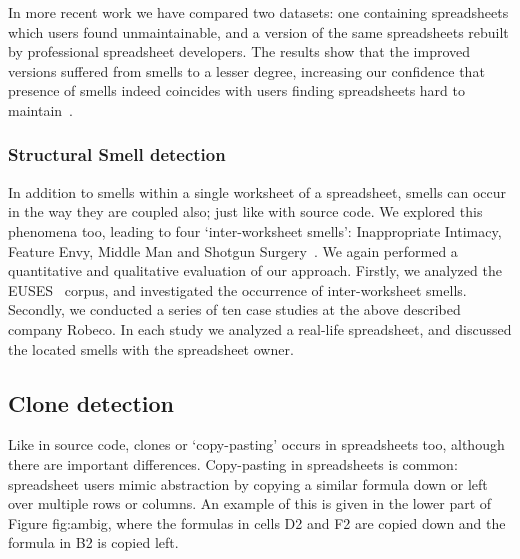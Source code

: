 \documentclass[conference]{IEEEtran}
\begin{document}
In more recent work we have compared two datasets: one containing spreadsheets which users found unmaintainable, and a version of the same spreadsheets rebuilt by professional spreadsheet developers. The results show that the improved versions suffered from smells to a lesser degree, increasing our confidence that presence of smells indeed coincides with users finding spreadsheets hard to maintain~\cite{Jansen2015}.



\subsubsection{Structural Smell detection}
In addition to smells within a single worksheet of a spreadsheet, smells can occur in the way they are coupled also; just like with source code. We explored this phenomena too, leading to four `inter-worksheet smells': Inappropriate Intimacy, Feature Envy, Middle Man and Shotgun Surgery~\cite{hermans_detecting_2012-1}. We again performed a quantitative and qualitative evaluation of our approach. Firstly, we analyzed the EUSES~\cite{fisher_euses_2005} corpus, and investigated the occurrence of inter-worksheet smells. Secondly, we conducted a series of ten case studies at the above described company Robeco. In each study we analyzed a real-life spreadsheet, and discussed the located smells with the spreadsheet owner.  

\subsection{Clone detection}
Like in source code, clones or `copy-pasting' occurs in spreadsheets too, although there are important differences. 
Copy-pasting in spreadsheets is common: spreadsheet users mimic abstraction by copying a similar formula down or left over multiple rows or columns. An example of this is given in the lower part of Figure {fig:ambig}, where the formulas in cells D2 and F2 are copied down and the formula in B2 is copied left.
\end{document}
